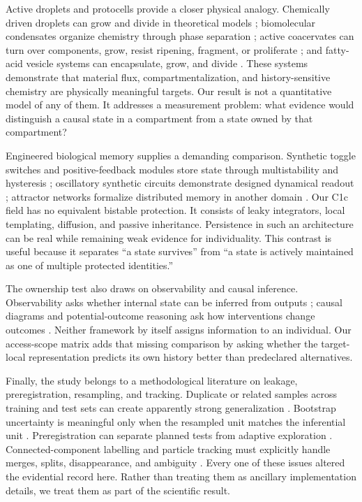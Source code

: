 \documentclass[11pt]{article}
\begin{document}
Active droplets and protocells provide a closer physical analogy. Chemically driven droplets can grow and divide in theoretical models \citep{zwicker2017}; biomolecular condensates organize chemistry through phase separation \citep{brangwynne2009,hyman2014,banani2017}; active coacervates can turn over components, grow, resist ripening, fragment, or proliferate \citep{donau2020,nakashima2021,matsuo2021}; and fatty-acid vesicle systems can encapsulate, grow, and divide \citep{hanczyc2003}. These systems demonstrate that material flux, compartmentalization, and history-sensitive chemistry are physically meaningful targets. Our result is not a quantitative model of any of them. It addresses a measurement problem: what evidence would distinguish a causal state in a compartment from a state owned by that compartment?

Engineered biological memory supplies a demanding comparison. Synthetic toggle switches and positive-feedback modules store state through multistability and hysteresis \citep{gardner2000,xiong2003}; oscillatory synthetic circuits demonstrate designed dynamical readout \citep{elowitz2000}; attractor networks formalize distributed memory in another domain \citep{hopfield1982}. Our C1c field has no equivalent bistable protection. It consists of leaky integrators, local templating, diffusion, and passive inheritance. Persistence in such an architecture can be real while remaining weak evidence for individuality. This contrast is useful because it separates ``a state survives'' from ``a state is actively maintained as one of multiple protected identities.''

The ownership test also draws on observability and causal inference. Observability asks whether internal state can be inferred from outputs \citep{hermann1977}; causal diagrams and potential-outcome reasoning ask how interventions change outcomes \citep{rubin1974,pearl1995}. Neither framework by itself assigns information to an individual. Our access-scope matrix adds that missing comparison by asking whether the target-local representation predicts its own history better than predeclared alternatives.

Finally, the study belongs to a methodological literature on leakage, preregistration, resampling, and tracking. Duplicate or related samples across training and test sets can create apparently strong generalization \citep{kaufman2012}. Bootstrap uncertainty is meaningful only when the resampled unit matches the inferential unit \citep{efron1979}. Preregistration can separate planned tests from adaptive exploration \citep{nosek2018}. Connected-component labelling and particle tracking must explicitly handle merges, splits, disappearance, and ambiguity \citep{rosenfeld1966,jaqaman2008}. Every one of these issues altered the evidential record here. Rather than treating them as ancillary implementation details, we treat them as part of the scientific result.
\end{document}
